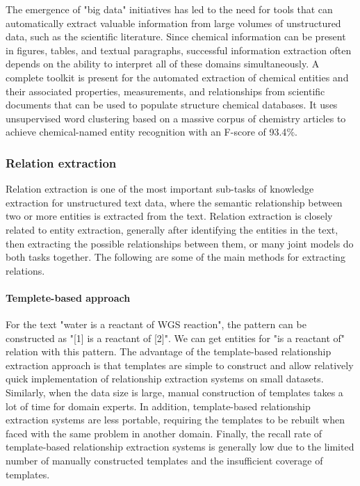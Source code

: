 \documentclass[%
 aip,
 jmp,%
 amsmath,amssymb,
 reprint,%
]{revtex4-2}
\begin{document}
The emergence of "big data" initiatives has led to the need for tools that can automatically extract valuable information from large volumes of unstructured data, such as the scientific literature. Since chemical information can be present in figures, tables, and textual paragraphs, successful information extraction often depends on the ability to interpret all of these domains simultaneously. A complete toolkit is present for the automated extraction of chemical entities and their associated properties, measurements, and relationships from scientific documents that can be used to populate structure chemical databases\cite{swain2016chemdataextractor}. It uses unsupervised word clustering based on a massive corpus of chemistry articles to achieve chemical-named entity recognition with an F-score of 93.4$\%$.

\subsubsection{Relation extraction}
Relation extraction is one of the most important sub-tasks of knowledge extraction for unstructured text data, where the semantic relationship between two or more entities is extracted from the text. Relation extraction is closely related to entity extraction, generally after identifying the entities in the text, then extracting the possible relationships between them, or many joint models do both tasks together\cite{yu2020relationship}. The following are some of the main methods for extracting relations.

\paragraph{Templete-based approach}
For the text "water is a reactant of WGS reaction", the pattern can be constructed as "[1] is a reactant of [2]". We can get entities for "is a reactant of" relation with this pattern. The advantage of the template-based relationship extraction approach is that templates are simple to construct and allow relatively quick implementation of relationship extraction systems on small datasets. Similarly, when the data size is large, manual construction of templates takes a lot of time for domain experts. In addition, template-based relationship extraction systems are less portable, requiring the templates to be rebuilt when faced with the same problem in another domain. Finally, the recall rate of template-based relationship extraction systems is generally low due to the limited number of manually constructed templates and the insufficient coverage of templates\cite{flynn2007automated, romano2006investigating}.
\end{document}

